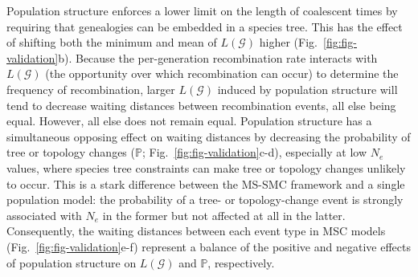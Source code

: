 \documentclass[11pt]{article}
\begin{document}

Population structure enforces a lower limit on the length of coalescent 
times by requiring that genealogies can be embedded in a species tree.
This has the effect of shifting both the minimum and mean of 
$L(\mathcal{G})$ higher (Fig.~\ref{fig:fig-validation}b). 
Because the per-generation recombination rate interacts with
$L(\mathcal{G})$ (the opportunity over which recombination can occur) to
determine the frequency of recombination, larger $L(\mathcal{G})$ induced
by population structure will tend to decrease waiting distances between 
recombination events, all else being equal. 
However, all else does not remain equal. 
Population structure has a simultaneous opposing effect on waiting distances by 
decreasing the probability of tree or topology changes 
($\mathbb{P}$; Fig.~\ref{fig:fig-validation}c-d), especially at low $N_e$ values,
where species tree constraints can make tree or topology changes unlikely
to occur. This is a stark difference between the MS-SMC framework and a 
single population model: the probability of a tree- or topology-change 
event is strongly associated with $N_e$ in the former but not affected 
at all in the latter. 
Consequently, the waiting distances between each event type in MSC models 
(Fig.~\ref{fig:fig-validation}e-f) represent a balance 
of the positive and negative effects of population structure on 
$L(\mathcal{G})$ and $\mathbb{P}$, respectively.
\end{document}
